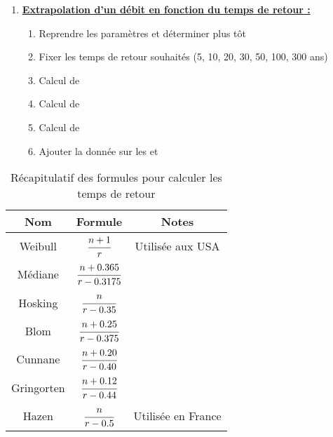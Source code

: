 \begin{enumerate}
\begin{enumerate}
\begin{itemize}
            \item {}
            \item {}
        \end{itemize}
    \end{enumerate}
    \bigskip
    \item \textbf{\underline{Extrapolation d'un débit en fonction du temps de retour :}}
    \begin{enumerate}
        \item Reprendre les paramètres  et  déterminer plus tôt
        \item Fixer les temps de retour  souhaités (5, 10, 20, 30, 50, 100, 300 ans)
        \item Calcul de 
        \item Calcul de 
        \item Calcul de 
        \item Ajouter la donnée  sur les  et 
    \end{enumerate}
\end{enumerate}

\begin{table}[h!]
    \centering
    \begin{tabular}{ccc}
        \toprule
        \textbf{Nom} & \textbf{Formule}            & \textbf{Notes}     \\
        \toprule
        Weibull      & $\cfrac{n+1}{r}$            & Utilisée aux USA   \\
        \midrule
        Médiane      & $\cfrac{n+0.365}{r-0.3175}$ &                    \\
        \midrule
        Hosking      & $\cfrac{n}{r-0.35}$         &                    \\
        \midrule
        Blom         & $\cfrac{n+0.25}{r-0.375}$   &                    \\
        \midrule
        Cunnane      & $\cfrac{n+0.20}{r-0.40}$    &                    \\
        \midrule
        Gringorten   & $\cfrac{n+0.12}{r-0.44}$    &                    \\
        \midrule
        Hazen        & $\cfrac{n}{r-0.5}$          & Utilisée en France \\
        \bottomrule
    \end{tabular}
    \caption{Récapitulatif des formules pour calculer les temps de retour}
    \label{tab:formuleTempsRetour}
\end{table}


